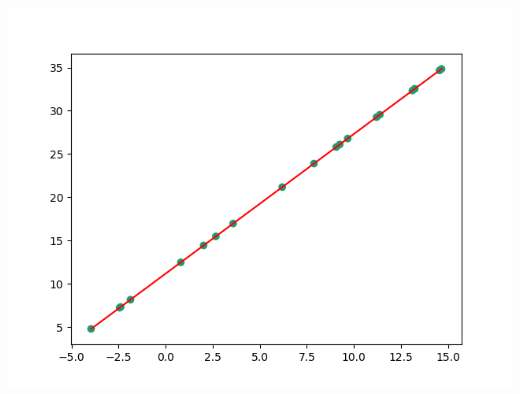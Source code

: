 \documentclass[notitlepage, 11pt]{report}
\begin{document}
		\includegraphics[width=\textwidth/3]{Figure_1}
\end{document}
